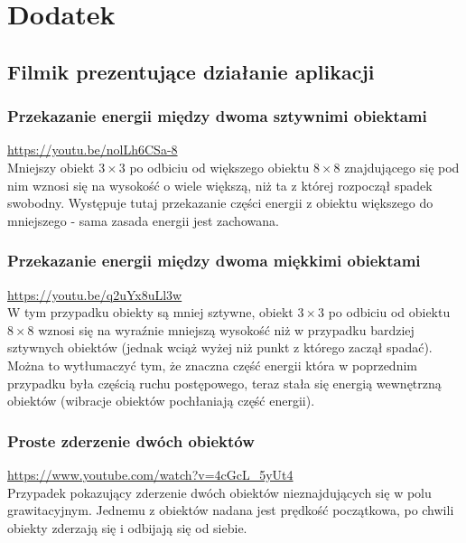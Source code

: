 \documentclass[12pt, letterpaper]{report}
\begin{document}
    \section{Dodatek}
    \subsection{Filmik prezentujące działanie aplikacji}
    
    \subsubsection{Przekazanie energii między dwoma sztywnimi obiektami}
    \url{https://youtu.be/nolLh6CSa-8} \\

    Mniejszy obiekt $3 \times 3$ po odbiciu od większego obiektu $8 \times  8$ 
    znajdującego się  pod nim wznosi się na
    wysokość o wiele większą, niż ta z której rozpoczął spadek swobodny.
    Występuje tutaj przekazanie części energii z obiektu 
    większego do mniejszego - sama zasada energii jest zachowana.

    \subsubsection{Przekazanie energii między dwoma miękkimi obiektami}
    \url{https://youtu.be/q2uYx8uLl3w} \\

    W tym przypadku obiekty są mniej sztywne, obiekt $3 \times 3$ po odbiciu 
    od obiektu $8 \times  8$ wznosi się na wyraźnie mniejszą wysokość niż w przypadku bardziej sztywnych obiektów
    (jednak wciąż wyżej niż punkt z którego zaczął spadać). Można to wytłumaczyć tym,
    że znaczna część energii która w poprzednim przypadku była częścią ruchu postępowego,
    teraz stała się energią wewnętrzną obiektów (wibracje obiektów pochłaniają część energii).

    \subsubsection{Proste zderzenie dwóch obiektów}
    \url{https://www.youtube.com/watch?v=4cGcL_5yUt4} \\ 

    Przypadek pokazujący zderzenie dwóch obiektów nieznajdujących się w polu grawitacyjnym.
    Jednemu z obiektów nadana jest prędkość początkowa, po chwili obiekty zderzają się i 
    odbijają się od siebie.
\end{document}
